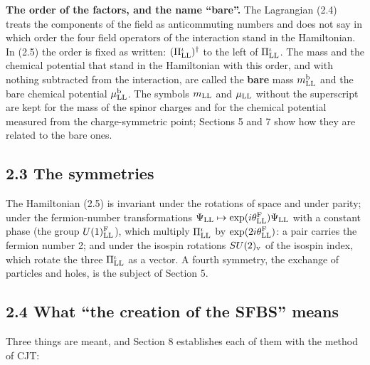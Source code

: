 \documentclass[
  10pt,
]{article}
\begin{document}
\textbf{The order of the factors, and the name ``bare''.} The Lagrangian
(2.4) treats the components of the field as anticommuting numbers and
does not say in which order the four field operators of the interaction
stand in the Hamiltonian. In (2.5) the order is fixed as written:
\((\Pi^\iota_{\rm LL})^\dagger\) to the left of \(\Pi^\iota_{\rm LL}\).
The mass and the chemical potential that stand in the Hamiltonian with
this order, and with nothing subtracted from the interaction, are called
the \textbf{bare} mass \(m^{\rm b}_{\rm LL}\) and the bare chemical
potential \(\mu^{\rm b}_{\rm LL}\). The symbols \(m_{\rm LL}\) and
\(\mu_{\rm LL}\) without the superscript are kept for the mass of the
spinor charges and for the chemical potential measured from the
charge-symmetric point; Sections 5 and 7 show how they are related to
the bare ones.

\hypertarget{the-symmetries}{%
\subsection{2.3 The symmetries}\label{the-symmetries}}

The Hamiltonian (2.5) is invariant under the rotations of space and
under parity; under the fermion-number transformations
\(\Psi_{\rm LL}\mapsto\exp(i\theta^{\rm F}_{\rm LL})\Psi_{\rm LL}\) with
a constant phase (the group \(U(1)^{\rm F}_{\rm LL}\)), which multiply
\(\Pi^\iota_{\rm LL}\) by \(\exp(2i\theta^{\rm F}_{\rm LL})\): a pair
carries the fermion number 2; and under the isospin rotations
\(SU(2)_{\rm v}\) of the isospin index, which rotate the three
\(\Pi^\iota_{\rm LL}\) as a vector. A fourth symmetry, the exchange of
particles and holes, is the subject of Section 5.

\hypertarget{what-the-creation-of-the-sfbs-means}{%
\subsection{2.4 What ``the creation of the SFBS''
means}\label{what-the-creation-of-the-sfbs-means}}

Three things are meant, and Section 8 establishes each of them with the
method of CJT:
\end{document}
